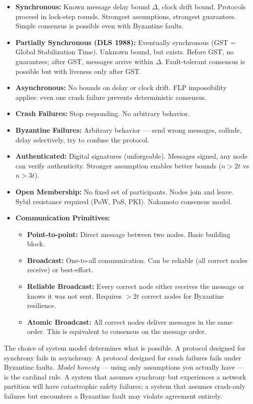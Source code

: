 \begin{itemize}
\item \textbf{Synchronous:} Known message delay bound $\Delta$, clock drift bound. Protocols proceed in lock-step rounds. Strongest assumptions, strongest guarantees. Simple consensus is possible even with Byzantine faults.
\item \textbf{Partially Synchronous (DLS 1988):} Eventually synchronous (GST = Global Stabilization Time). Unknown bound, but exists. Before GST, no guarantees; after GST, messages arrive within $\Delta$. Fault-tolerant consensus is possible but with liveness only after GST.
\item \textbf{Asynchronous:} No bounds on delay or clock drift. FLP impossibility applies: even one crash failure prevents deterministic consensus.
\item \textbf{Crash Failures:} Stop responding. No arbitrary behavior.
\item \textbf{Byzantine Failures:} Arbitrary behavior — send wrong messages, collude, delay selectively, try to confuse the protocol.
\item \textbf{Authenticated:} Digital signatures (unforgeable). Messages signed, any node can verify authenticity. Stronger assumption enables better bounds ($n > 2t$ vs $n > 3t$).
\item \textbf{Open Membership:} No fixed set of participants. Nodes join and leave. Sybil resistance required (PoW, PoS, PKI). Nakamoto consensus model.
\item \textbf{Communication Primitives:}
\begin{itemize}
\item \textbf{Point-to-point:} Direct message between two nodes. Basic building block.
\item \textbf{Broadcast:} One-to-all communication. Can be reliable (all correct nodes receive) or best-effort.
\item \textbf{Reliable Broadcast:} Every correct node either receives the message or knows it was not sent. Requires $> 2t$ correct nodes for Byzantine resilience.
\item \textbf{Atomic Broadcast:} All correct nodes deliver messages in the same order. This is equivalent to consensus on the message order.
\end{itemize}
\end{itemize}

The choice of system model determines what is possible. A protocol designed for synchrony fails in asynchrony. A protocol designed for crash failures fails under Byzantine faults. \emph{Model honesty} — using only assumptions you actually have — is the cardinal rule. A system that assumes synchrony but experiences a network partition will have catastrophic safety failures; a system that assumes crash-only failures but encounters a Byzantine fault may violate agreement entirely.

